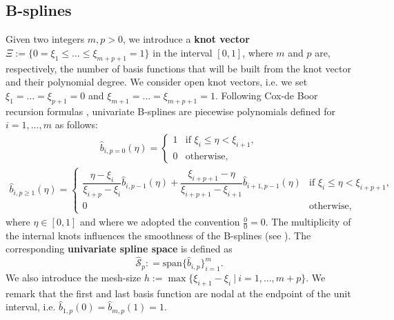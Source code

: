 \documentclass{article}
\newcommand{\ndof}{m}
\theoremstyle{plain}
\numberwithin{equation}{section}
\begin{document}
\subsection{B-splines} \label{subsec:prel-bsplines}
Given two integers $\ndof, p > 0$,   we introduce a \textbf{knot vector} $\Xi:=\{0=\xi_1\leq \ldots \leq \xi_{\ndof+p+1}=1\}$ in the interval $[0,1]$, where $\ndof$ and $p$ are, respectively, the number of basis functions that will be built from the knot vector and their polynomial degree.
We consider open knot vectors, i.e. we set $\xi_1=\ldots=\xi_{p+1}=0$ and $\xi_{\ndof+1}=\ldots=\xi_{\ndof+p+1}=1$.
Following Cox-de Boor recursion formulas \cite{de1978practical}, univariate B-splines are piecewise polynomials   defined for $i=1,\ldots,\ndof$ as follows:
\begin{eqnarray*}
    \widehat{b}_{i, p=0}(\eta)= \begin{cases}1 & { \textrm{if }} \xi_{i}\leq \eta<\xi_{i+1}, \\
             0 & \textrm{otherwise},
    \end{cases}
\end{eqnarray*}
\begin{eqnarray*}
    \widehat{b}_{i,p \ge 1}(\eta)=\! \begin{cases}\dfrac{\eta-\xi_{i}}{\xi_{i+p}-\xi_{i}}\widehat{b}_{ i, p-1}(\eta) +\dfrac{\xi_{i+p+1}-\eta}{\xi_{i+p+1}-\xi_{i+1}}\widehat{b}_{ i+1, p-1}(\eta) & { \textrm{if }} \xi_{i}\leq \eta<\xi_{i+p+1}, \\[8pt]
             0                                                                                                                                                & \textrm{otherwise,}
    \end{cases}
\end{eqnarray*}
where $\eta \in [0, 1]$ and where we adopted the convention $\frac{0}{0}=0$. The multiplicity of the internal knots influences the smoothness of the B-splines (see \cite{cottrell2009isogeometric}).
The corresponding \textbf{univariate spline space} is defined as
\begin{equation*}
    \widehat{\mathcal{S}}_p: = \mathrm{span}\{\widehat{b}_{i,p}\}_{i = 1}^\ndof.
\end{equation*}
We also introduce the mesh-size $h:=\max\{\xi_{i+1}-\xi_i \ | \ i=1,\ldots, \ndof+p\}$.
We remark that the first and last basis function are nodal at the endpoint of the unit interval, i.e. $ \widehat{b}_{1,p}\left(0\right) = \widehat{b}_{\ndof,p}\left(1\right) = 1$.
\end{document}
